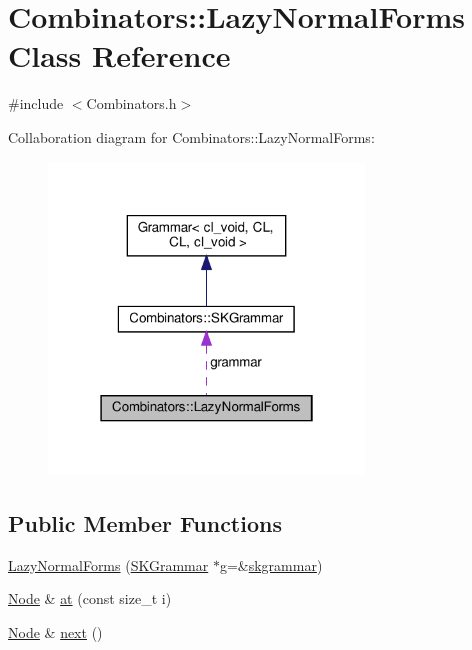 \hypertarget{class_combinators_1_1_lazy_normal_forms}{}\section{Combinators\+:\+:Lazy\+Normal\+Forms Class Reference}
\label{class_combinators_1_1_lazy_normal_forms}


{\ttfamily \#include $<$Combinators.\+h$>$}



Collaboration diagram for Combinators\+:\+:Lazy\+Normal\+Forms\+:
\nopagebreak
\begin{figure}[H]
\begin{center}
\leavevmode
\includegraphics[width=238pt]{class_combinators_1_1_lazy_normal_forms__coll__graph}
\end{center}
\end{figure}
\subsection*{Public Member Functions}
\begin{DoxyCompactItemize}
\item 
\hyperlink{class_combinators_1_1_lazy_normal_forms_ab3e10fd3a3d3611aaffbd11e6e6dd6f0}{Lazy\+Normal\+Forms} (\hyperlink{class_combinators_1_1_s_k_grammar}{S\+K\+Grammar} $\ast$g=\&\hyperlink{namespace_combinators_a24aeacfa083d06000a89cb59d14eeccb}{skgrammar})
\item 
\hyperlink{class_node}{Node} \& \hyperlink{class_combinators_1_1_lazy_normal_forms_a6cd27fdb59899d435c5114288b614067}{at} (const size\+\_\+t i)
\item 
\hyperlink{class_node}{Node} \& \hyperlink{class_combinators_1_1_lazy_normal_forms_a7a95278f40ba41d7148be0d55d46baa4}{next} ()
\end{DoxyCompactItemize}
